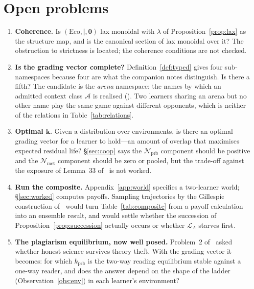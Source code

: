 \documentclass[11pt,a4paper]{article}
\theoremstyle{plain}
\theoremstyle{definition}
\theoremstyle{remark}
\newcommand{\Lrn}{\mathcal{L}}
\newcommand{\Nsp}{\mathcal{N}}
\newcommand{\Met}{\Nsp_{\mathrm{met}}}
\newcommand{\Prb}{\Nsp_{\mathrm{prb}}}
\begin{document}
\section{Open problems}

\begin{enumerate}[itemsep=4pt]
\item \textbf{Coherence.} Is $(\mathrm{Eco}, \mid, \mathbf{0})$ lax monoidal with
$\lambda$ of Proposition~\ref{prop:lax} as the structure map, and is the canonical section of
\cite[Prop.~80]{scientist} lax monoidal over it? The obstruction to strictness is located; the
coherence conditions are not checked.

\item \textbf{Is the grading vector complete?} Definition~\ref{def:typed} gives four
sub-namespaces because four are what the companion notes distinguish. Is there a fifth? The
candidate is the \emph{arena} namespace: the names by which an admitted context class
$\mathcal{A}$ is realised (\cite[Obs.~4]{game}). Two learners sharing an arena but no other name
play the same game against different opponents, which is neither of the relations in
Table~\ref{tab:relations}.

\item \textbf{Optimal $\mathbf{k}$.} Given a distribution over environments, is there an optimal
grading vector for a learner to hold---an amount of overlap that maximises expected residual
life? \S\ref{sec:coop} says the $\Prb$ component should be positive and the $\Met$ component
should be zero or pooled, but the trade-off against the exposure of Lemma~33
of~\cite{scientist} is not worked.

\item \textbf{Run the composite.} Appendix~\ref{app:world} specifies a two-learner world;
\S\ref{sec:worked} computes payoffs. Sampling trajectories by the Gillespie construction
of~\cite{gillespie-note} would turn Table~\ref{tab:composite} from a payoff calculation into an
ensemble result, and would settle whether the succession of Proposition~\ref{prop:succession}
actually occurs or whether $\Lrn_A$ starves first.

\item \textbf{The plagiarism equilibrium, now well posed.} Problem~2 of~\cite{scientist} asked
whether honest science survives theory theft. With the grading vector it becomes: for which
$k_{\mathrm{prb}}$ is the two-way reading equilibrium stable against a one-way reader, and does
the answer depend on the shape of the ladder (Observation~\ref{obs:env}) in each learner's
environment?


\end{enumerate}
\end{document}
